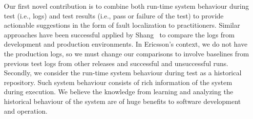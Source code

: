Our first novel contribution is to combine both run-time system behaviour during test (i.e., logs) and test results (i.e., pass or failure of the test) to provide actionable suggestions in the form of fault localization to practitioners. Similar approaches have been successful applied by Shang~\cite{Shang:2013:ADB:2486788.2486842} to compare the logs from development and production environments. In Ericsson's context, we do not have the production logs, so we must change our comparisons to involve baselines from previous test logs from other releases and successful and unsuccessful runs. Secondly, we consider the run-time system behaviour during test as a historical repository. Such system behaviour consists of rich information of the system during execution. We believe the knowledge from learning and analyzing the historical behaviour of the system are of huge benefits to software development and operation.

